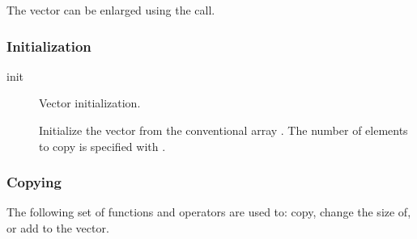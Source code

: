 The vector can be enlarged using the  call.

\subsubsection{Initialization}
\begin{description}

\item[init] \texonly{---} Vector initialization.\\

Initialize the vector from the conventional array .  The
number of elements to copy is specified with .
\end{description}

\subsubsection{Copying}
\label{sec:vector-copying}

The following set of functions and operators are used to: copy, change the
size of, or add to the vector.  

